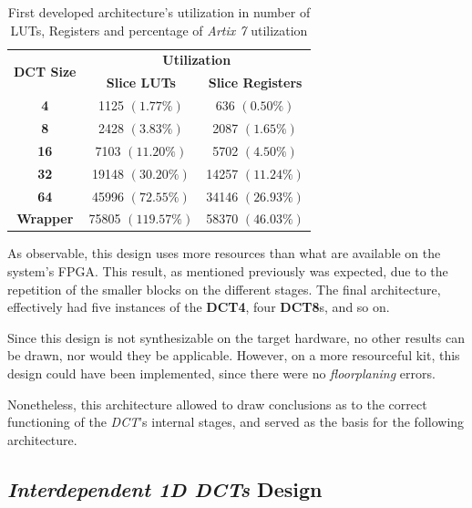 \begin{table}[!htpb]
    \centering
    \begin{tabular}{ccc} \toprule
        \multirow{2}{*}{\textbf{DCT Size}} &     \multicolumn{2}{c}{\textbf{Utilization}} \\
         &      \textbf{Slice LUTs} &      \textbf{Slice Registers} \\ \toprule
        \textbf{4} &    1125 $(1.77\%)$ &       636 $(0.50\%)$ \\ \hline
        \textbf{8} &    2428 $(3.83\%)$ &       2087 $(1.65\%)$ \\ \hline
        \textbf{16} &   7103 $(11.20\%)$ &      5702 $(4.50\%)$ \\ \hline
        \textbf{32} &   19148 $(30.20\%)$ &     14257 $(11.24\%)$  \\ \hline
        \textbf{64} &   45996 $(72.55\%)$  &    34146 $(26.93\%)$  \\ \bottomrule        
        \textbf{Wrapper} & 75805 $(119.57\%)$ & 58370 $(46.03\%)$ \\
        \bottomrule
    \end{tabular}
    \caption{First developed architecture's utilization in number of LUTs, Registers and percentage of \emph{Artix 7} utilization}
    \label{tab:v1results}
\end{table}

As observable, this design uses more resources than what are available on the system's FPGA. This result, as mentioned previously was expected, due to the repetition of the smaller blocks on the different stages. The final architecture, effectively had five instances of the \textbf{DCT4}, four \textbf{DCT8}s, and so on. 

Since this design is not synthesizable on the target hardware, no other results can be drawn, nor would they be applicable. However, on a more resourceful kit, this design could have been implemented, since there were no \emph{\gls{floorplaning}} errors.

Nonetheless, this architecture allowed to draw conclusions as to the correct functioning of the \emph{DCT}'s internal stages, and served as the basis for the following architecture.

\subsection{\emph{Interdependent 1D DCTs} Design}

